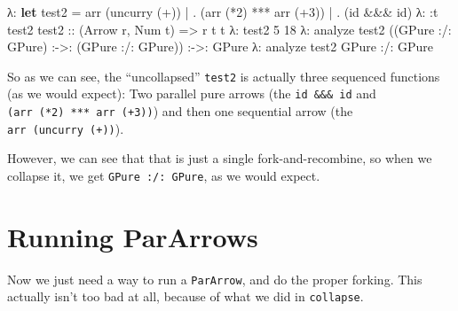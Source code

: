 \documentclass[]{article}
\newenvironment{Shaded}{}{}
\newcommand{\DataTypeTok}[1]{\textcolor[rgb]{0.56,0.13,0.00}{#1}}
\newcommand{\DecValTok}[1]{\textcolor[rgb]{0.25,0.63,0.44}{#1}}
\newcommand{\FunctionTok}[1]{\textcolor[rgb]{0.02,0.16,0.49}{#1}}
\newcommand{\KeywordTok}[1]{\textcolor[rgb]{0.00,0.44,0.13}{\textbf{#1}}}
\newcommand{\NormalTok}[1]{#1}
\newcommand{\OperatorTok}[1]{\textcolor[rgb]{0.40,0.40,0.40}{#1}}
\newcommand{\OtherTok}[1]{\textcolor[rgb]{0.00,0.44,0.13}{#1}}
\begin{document}
\begin{Shaded}
\begin{Highlighting}[]
\NormalTok{λ}\OperatorTok{:} \KeywordTok{let}\NormalTok{ test2 }\OtherTok{=}\NormalTok{ arr (}\FunctionTok{uncurry}\NormalTok{ (}\OperatorTok{+}\NormalTok{))}
 \OperatorTok{|}           \OperatorTok{.}\NormalTok{ (arr (}\OperatorTok{*}\DecValTok{2}\NormalTok{) }\OperatorTok{***}\NormalTok{ arr (}\OperatorTok{+}\DecValTok{3}\NormalTok{))}
 \OperatorTok{|}           \OperatorTok{.}\NormalTok{ (}\FunctionTok{id} \OperatorTok{\&\&\&} \FunctionTok{id}\NormalTok{)}
\NormalTok{λ}\OperatorTok{:} \OperatorTok{:}\NormalTok{t test2}
\OtherTok{test2 ::}\NormalTok{ (}\DataTypeTok{Arrow}\NormalTok{ r, }\DataTypeTok{Num}\NormalTok{ t) }\OtherTok{=\textgreater{}}\NormalTok{ r t t}
\NormalTok{λ}\OperatorTok{:}\NormalTok{ test2 }\DecValTok{5}
\DecValTok{18}
\NormalTok{λ}\OperatorTok{:}\NormalTok{ analyze\textquotesingle{} test2}
\NormalTok{((}\DataTypeTok{GPure} \OperatorTok{:/:} \DataTypeTok{GPure}\NormalTok{) }\OperatorTok{:{-}\textgreater{}:}\NormalTok{ (}\DataTypeTok{GPure} \OperatorTok{:/:} \DataTypeTok{GPure}\NormalTok{)) }\OperatorTok{:{-}\textgreater{}:} \DataTypeTok{GPure}
\NormalTok{λ}\OperatorTok{:}\NormalTok{ analyze test2}
\DataTypeTok{GPure} \OperatorTok{:/:} \DataTypeTok{GPure}
\end{Highlighting}
\end{Shaded}

So as we can see, the ``uncollapsed'' \texttt{test2} is actually three sequenced
functions (as we would expect): Two parallel pure arrows (the
\texttt{id\ \&\&\&\ id} and \texttt{(arr\ (*2)\ ***\ arr\ (+3))}) and then one
sequential arrow (the \texttt{arr\ (uncurry\ (+))}).

However, we can see that that is just a single fork-and-recombine, so when we
collapse it, we get \texttt{GPure\ :/:\ GPure}, as we would expect.

\section{Running ParArrows}\label{running-pararrows}

Now we just need a way to run a \texttt{ParArrow}, and do the proper forking.
This actually isn't too bad at all, because of what we did in \texttt{collapse}.
\end{document}
